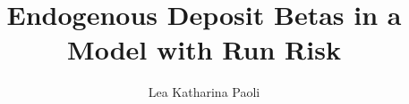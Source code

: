 \documentclass[final]{beamer}
\title{\Large Endogenous Deposit Betas in a Model with Run Risk}
\author{Lea Katharina Paoli \inst{1}}
\institute[shortinst]{\inst{1} Leibniz Institute for Financial Research SAFE \& Goethe University Frankfurt %
}
\newif\ifwithlogo
\newlength{\colwidth}
\newcommand{\separatorcolumn}{\begin{column}{\sepwidth}\end{column}}
\begin{document}
\ifwithlogo
\addtobeamertemplate{headline}{}
{
    \begin{tikzpicture}[remember picture, overlay]
      \node[anchor=north west, xshift=3cm, yshift=-\headeroffset + 0.3cm] at (current page.north west) {
        \texttt{[image: figures/goethe\_logo.png]}
      };

      \node[anchor=north east, xshift=-3cm, yshift=-\headeroffset + 0.3cm] at (current page.north east) {
        \texttt{[image: figures/safe\_logo.jpg]}
      };
    \end{tikzpicture}
}
\fi

\begin{frame}[t]
\begin{columns}[t]
\separatorcolumn

\begin{column}{\colwidth}

\end{column}

\separatorcolumn

\begin{column}{\colwidth}

\end{column}

\separatorcolumn

\begin{column}{\colwidth}

\end{column}

\separatorcolumn
\end{columns}
\end{frame}
\end{document}
